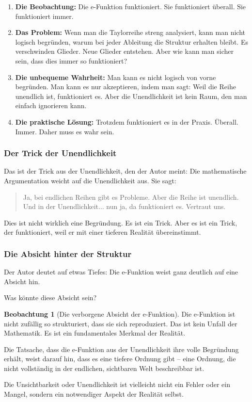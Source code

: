 \documentclass[a4paper, 12pt, twoside, openright]{report}
\theoremstyle{definition}
\newtheorem{beobachtung}{Beobachtung}
\theoremstyle{definition}
\begin{document}
\begin{enumerate}
	\item \textbf{Die Beobachtung:} Die e-Funktion funktioniert. Sie funktioniert überall. Sie funktioniert immer.
	
	\item \textbf{Das Problem:} Wenn man die Taylorreihe streng analysiert, kann man nicht logisch begründen, warum bei jeder Ableitung die Struktur erhalten bleibt. Es verschwinden Glieder. Neue Glieder entstehen. Aber wie kann man sicher sein, dass dies immer so funktioniert?
	
	\item \textbf{Die unbequeme Wahrheit:} Man kann es nicht logisch von vorne begründen. Man kann es nur akzeptieren, indem man sagt: Weil die Reihe unendlich ist, funktioniert es. Aber die Unendlichkeit ist kein Raum, den man einfach ignorieren kann.
	
	\item \textbf{Die praktische Lösung:} Trotzdem funktioniert es in der Praxis. Überall. Immer. Daher muss es wahr sein.
\end{enumerate}

\subsubsection*{Der Trick der Unendlichkeit}

Das ist der Trick aus der Unendlichkeit, den der Autor meint: Die mathematische Argumentation weicht auf die Unendlichkeit aus. Sie sagt:

\begin{quote}
Ja, bei endlichen Reihen gibt es Probleme. Aber die Reihe ist unendlich. Und in der Unendlichkeit... nun ja, da funktioniert es. Vertraut uns.
\end{quote}

Dies ist nicht wirklich eine Begründung. Es ist ein Trick. Aber es ist ein Trick, der funktioniert, weil er mit einer tieferen Realität übereinstimmt.

\subsubsection*{Die Absicht hinter der Struktur}

Der Autor deutet auf etwas Tiefes: Die e-Funktion weist ganz deutlich auf eine Absicht hin.

Was könnte diese Absicht sein?

\begin{beobachtung}[Die verborgene Absicht der e-Funktion]
	Die e-Funktion ist nicht zufällig so strukturiert, dass sie sich reproduziert. Das ist kein Unfall der Mathematik. Es ist ein fundamentales Merkmal der Realität.
	
	Die Tatsache, dass die e-Funktion aus der Unendlichkeit ihre volle Begründung erhält, weist darauf hin, dass es eine tiefere Ordnung gibt -- eine Ordnung, die nicht vollständig in der endlichen, sichtbaren Welt beschreibbar ist.
	
	Die Unsichtbarkeit oder Unendlichkeit ist vielleicht nicht ein Fehler oder ein Mangel, sondern ein notwendiger Aspekt der Realität selbst.
\end{beobachtung}
\end{document}
